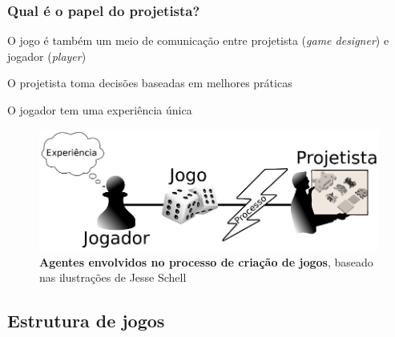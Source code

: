 \expandafter\documentclass\expandafter[table, usenames, svgnames, dvipsnames, \classopts]{beamer}
\begin{document}
\begin{frame}
	\frametitle{\textbf{Qual é o papel do projetista?}}

	O jogo é também um meio de comunicação entre projetista (\textit{game designer}) e jogador (\textit{player})

	\vspace{1em}

	\begin{outline}
		\1 O projetista toma decisões baseadas em melhores práticas
		
		\vspace{1em}
		
		\1 O jogador tem uma experiência única
	\end{outline}
	
 	\begin{figure}
	    \centering
        \includegraphics[height=0.3\paperheight]{processo-experiencia}
        \caption{\textbf{Agentes envolvidos no processo de criação de jogos}, baseado nas ilustrações de Jesse Schell}
    \end{figure}

\end{frame}

\subsection{Estrutura de jogos}
\end{document}

